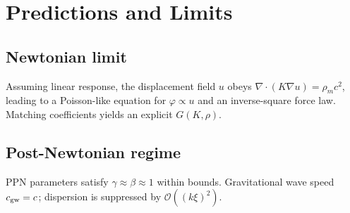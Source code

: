 
\section{Predictions and Limits}\label{sec:predictions}
\subsection{Newtonian limit}
Assuming linear response, the displacement field $u$ obeys $\nabla\cdot(K\nabla u)=\rho_m c^2$, leading to a Poisson-like equation for $\varphi\propto u$ and an inverse-square force law. Matching coefficients yields an explicit $G(K,\rho)$.
\subsection{Post-Newtonian regime}
PPN parameters satisfy $\gamma\approx\beta\approx 1$ within bounds. Gravitational wave speed $c_{\rm gw}=c$; dispersion is suppressed by $\mathcal{O}((k\xi)^2)$.

